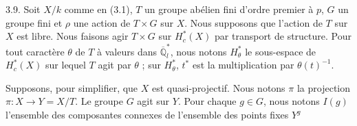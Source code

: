 \documentclass[9pt,twoside]{extarticle}
\begin{document}
{3.9. Soit \(X/k\) comme en (3.1), \(T\) un groupe abélien fini d'ordre premier à \(p\), \(G\) un groupe fini et \(\rho\) une action de \(T\times G\) sur \(X\). Nous supposons que l'action de \(T\) sur \(X\) est libre. Nous faisons agir \(T\times G\) sur \(H_c^*(X)\) par transport de structure. Pour tout caractère \(\theta\) de \(T\) à valeurs dans \(\overline{\mathbb Q}_l^*\), nous notons \(H_\theta^*\) le sous-espace de \(H_c^*(X)\) sur lequel \(T\) agit par \(\theta\) ; sur \(H_\theta^*\), \(t^*\) est la multiplication par \(\theta(t)^{-1}\).\par

Supposons, pour simplifier, que \(X\) est quasi-projectif. Nous notons \(\pi\) la projection \(\pi:X\to Y=X/T\). Le groupe \(G\) agit sur \(Y\). Pour chaque \(g\in G\), nous notons \(I(g)\) l'ensemble des composantes connexes de l'ensemble des points fixes \(Y^g\)\par
}
\end{document}

